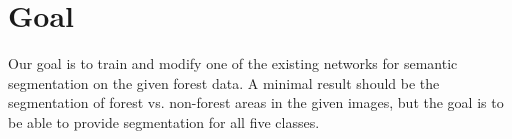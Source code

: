 \documentclass[rnd]{mas_proposal}
\begin{document}
    \section{Goal}

    Our goal is to train and modify one of the existing networks for semantic segmentation on the given forest data. A minimal result should be the segmentation of forest vs. non-forest areas in the given images, but the goal is to be able to provide segmentation for all five classes.





 
\end{document}
